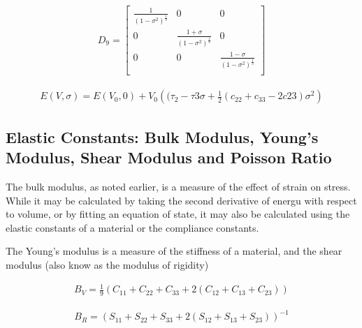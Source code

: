 \documentclass[12pt,twoside]{manual}
\begin{document}
  \begin{equation}
    \begin{split}
      D_{9} = 
      \begin{bmatrix}
      \frac{1}{(1-\sigma^2)^{\frac{1}{3}}} & 0           & 0              \\
      0  & \frac{1 + \sigma}{(1-\sigma^2)^{\frac{1}{3}}}      &   0  \\
      0  &   0  & \frac{1 - \sigma}{(1-\sigma^2)^{\frac{1}{3}}}       \\
      \end{bmatrix}
    \end{split}
  \end{equation}

  \begin{equation}
    \begin{split}
    E(V,\sigma) = E(V_{0},0) + V_{0} \left((\tau_{2}-\tau{3} \sigma + \frac{1}{2} (c_{22} + c_{33} - 2 c{23}) \sigma^2 \right)
    \end{split}
  \end{equation}


\subsection{Elastic Constants: Bulk Modulus, Young's Modulus, Shear Modulus and Poisson Ratio}

The bulk modulus, as noted earlier, is a measure of the effect of strain on stress.  While it may be calculated by taking the second derivative of energu with respect to volume, or by fitting an equation of state, it may also be calculated using the elastic constants of a material or the compliance constants.

The Young's modulus is a measure of the stiffness of a material, and the shear modulus (also know as the modulus of rigidity) 

\begin{equation}
\begin{split}
B_{V} = \frac{1}{9} \left( C_{11} + C_{22} + C_{33} + 2(C_{12} + C_{13} + C_{23}) \right)
\end{split}
\label{eq:eqLennardJones}
\end{equation}

\begin{equation}
\begin{split}
B_{R} = \left( S_{11} + S_{22} + S_{33} + 2(S_{12} + S_{13} + S_{23}) \right)^{-1}
\end{split}
\label{eq:eqLennardJones}
\end{equation}
\end{document}
